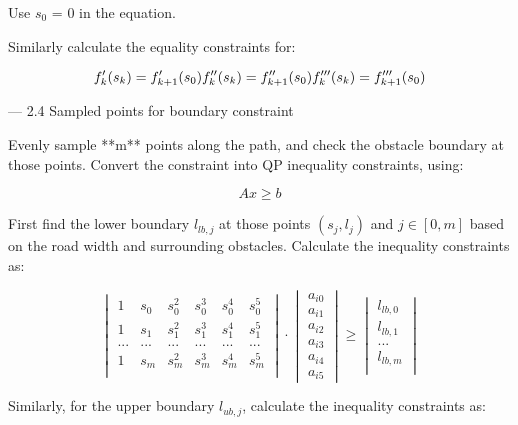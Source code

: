 \documentclass[a4paper,11pt]{article}  %
\begin{document}
Use $s_0$ = 0 in the equation.

Similarly calculate the equality constraints for: 

$$
f'_k(s_k) = f'_{k+1} (s_0)
\\
f''_k(s_k) = f''_{k+1} (s_0)
\\
f'''_k(s_k) = f'''_{k+1} (s_0)
$$


--- 2.4  Sampled points for boundary constraint

Evenly sample **m** points along the path, and check the obstacle boundary at those points.  Convert the constraint into QP inequality constraints, using:

$$
Ax \geq b
$$

First find the lower boundary $l_{lb,j}$ at those points $(s_j, l_j)$ and  $j\in[0, m]$ based on the road width and surrounding obstacles. Calculate the inequality constraints as:

$$
\begin{vmatrix} 
 1 & s_0 & s_0^2 & s_0^3 & s_0^4&s_0^5 \\
  1 & s_1 & s_1^2 & s_1^3 & s_1^4&s_1^5 \\
 ...&...&...&...&...&... \\
 1 & s_m & s_m^2 & s_m^3 & s_m^4&s_m^5 \\
 \end{vmatrix} \cdot \begin{vmatrix}a_{i0} \\ a_{i1} \\ a_{i2} \\ a_{i3} \\ a_{i4} \\ a_{i5}  \end{vmatrix} 
 \geq 
 \begin{vmatrix}
 l_{lb,0}\\
 l_{lb,1}\\
 ...\\
 l_{lb,m}\\
 \end{vmatrix}
$$



Similarly, for the upper boundary $l_{ub,j}$, calculate the inequality constraints as: 
\end{document}
